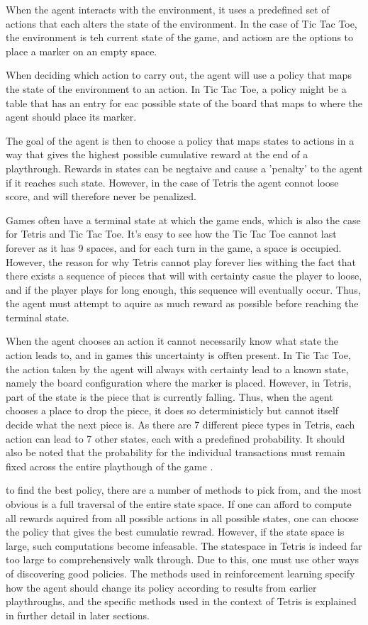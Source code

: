 When the agent interacts 
with the environment, it uses a predefined set of actions
that each alters the state of the environment. In the case of 
Tic Tac Toe, the environment is teh current state of the game, 
and actiosn are the options to place a marker
on an empty space.

When deciding which action to carry out, the agent will use
a policy that maps the state of the environment to an action.
In Tic Tac Toe, a policy might be a table that has an entry for eac possible
state of the board that maps to where the agent should place its marker.


The goal of the agent is then to choose a policy that maps states to actions 
in a way that
gives the highest possible cumulative reward at the end of a playthrough. 
Rewards in states can be negtaive and cause a 'penalty' to the agent if it reaches
such state. However, in the case of Tetris the agent connot loose score,
and will therefore never be penalized.

Games often have a terminal state at which the game ends, which is 
also the case for Tetris and Tic Tac Toe. It's easy to see how the
Tic Tac Toe cannot last forever as it has 9 spaces, and for each turn in the game,
a space is occupied. However, the reason for why Tetris cannot play forever
lies withing the fact that there exists a sequence of pieces that will
with certainty casue the player to loose, and if the player plays for 
long enough, this sequence will eventually occur. Thus, the agent must
attempt to aquire as much reward as possible before reaching the terminal 
state. 

When the agent chooses an action it cannot necessarily know what state
the action leads to, and in games this uncertainty is offten present.
In Tic Tac Toe, the action taken by the agent will always with certainty 
lead to a known state, namely the board configuration where the marker is placed.
However, in Tetris, part of the state is the piece that is currently falling.
Thus, when the agent chooses a place to drop the piece, it does so deterministicly
but cannot itself decide what the next piece is. As there are 7 different piece
types in Tetris, each action can lead to 7 other states, each with a predefined probability.
It should also be noted that the probability for the individual transactions
must remain fixed across the entire playthough of the game \citep{Carr}.

to find the best policy, there are a number of methods to pick from,
and the most obvious is a full traversal of the entire state space.
If one can afford to compute all rewards aquired from all possible 
actions in all possible states, one can choose the policy 
that gives the best cumulatie rewrad. However, if the state space is
large, such computations become infeasable. The statespace in Tetris
is indeed far too large to comprehensively walk through.
Due to this, one must use other ways of discovering good policies.
The methods used in reinforcement learning 
specify how the agent should change its policy according to 
results from earlier playthroughs, and the specific methods used in
the context of Tetris is explained in further detail in later sections.


